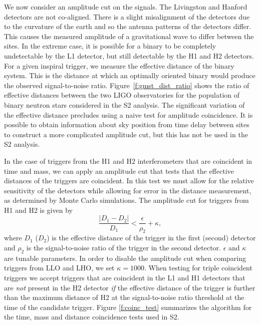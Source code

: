 We now consider an amplitude cut on the signals. The Livingston and Hanford
detectors are not co-aligned. There is a slight misalignment of the detectors
due to the curvature of the earth and so the antenna patterns of the detectors
differ. This causes the measured amplitude of a gravitational wave to differ
between the sites. In the extreme case, it is possible for a binary to be
completely undetectable by the L1 detector, but still detectable by the H1 and
H2 detectors. For a given inspiral trigger, we measure the effective
distance of the binary system. This is the distance at which an optimally
oriented binary would produce the observed signal-to-noise ratio.
Figure~\ref{f:gmst_dist_ratio} shows the ratio of effective distances between
the two LIGO observatories for the population of binary neutron stars
considered in the S2 analysis. The significant variation of the effective
distance precludes using a naive test for amplitude coincidence. It is
possible to obtain information about sky position from time delay between
sites to construct a more complicated amplitude cut, but this has not be used
in the S2 analysis.

In the case of triggers from the H1 and H2 interferometers that are coincident
in time and mass, we can apply an amplitude cut that tests that the effective
distances of the triggers are coincident. In this test we must allow for the
relative sensitivity of the detectors while allowing for error in the distance
measurement, as determined by Monte Carlo simulations. The amplitude cut for
triggers from H1 and H2 is given by 
\begin{equation}
\label{eq:eff_dist_test}
\frac{\left|D_\mathrm{1} - D_\mathrm{2}\right|}{D_\mathrm{1}}
< \frac{\epsilon}{\rho_\mathrm{2}} + \kappa,
\end{equation}
where $D_1$ ($D_2$) is the effective distance of the trigger in the first
(second) detector and $\rho_{2}$ is the signal-to-noise ratio of the trigger
in the second detector. $\epsilon$ and $\kappa$ are tunable parameters.
In order to disable the amplitude cut when comparing triggers from LLO and
LHO, we set $\kappa = 1000$.  When testing for triple coincident triggers we
accept triggers that are coincident in the L1 and H1 detectors that are
\emph{not} present in the H2 detector \emph{if} the effective distance of the
trigger is further than the maximum distance of H2 at the signal-to-noise
ratio threshold at the time of the candidate trigger.  Figure
\ref{f:coinc_test} summarizes the algorithm for the time, mass and distance
coincidence tests used in S2. 


